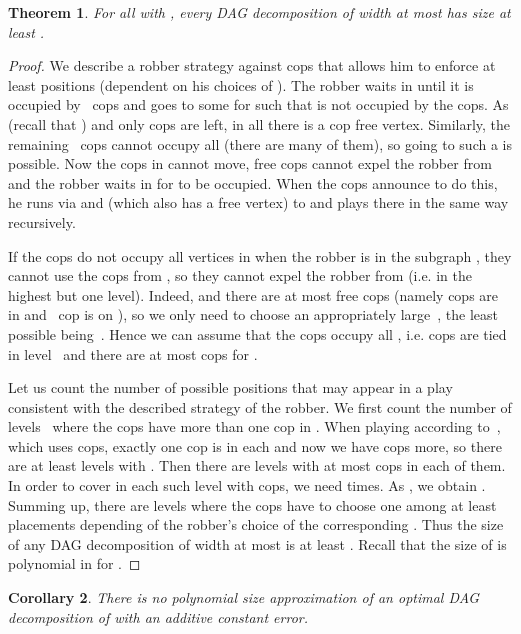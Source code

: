\documentclass[authoryear]{article}
\makeatletter
\newtheorem{theorem}{Theorem}
\newtheorem{corollary}[theorem]{Corollary}
\theoremstyle{definition}
\newcommand{\0}{\emptyset}
\newcommand{\ie}{i.e.\@\xspace}
\makeatother
\begin{document}
\begin{theorem}
  For all  with , every DAG decomposition of width at most 
  has size at least .
\end{theorem}
\begin{proof}
  We describe a robber strategy against  cops that allows
  him to enforce at least  positions (dependent on his choices of
  ). The robber waits in  until it is occupied
  by~ cops and goes to some  for  such that 
  is not occupied by the cops. As  (recall that
  ) and only  cops are left, in all
   there is a cop free vertex. Similarly, the remaining~
  cops cannot occupy all  (there are  many of them), so going to such a  is
  possible. Now the cops in  cannot move,  free cops
  cannot expel the robber from  and the robber waits in
   for  to be occupied. When the cops announce to do
  this, he runs via  and  (which also has a free
  vertex) to  and plays there in the same
  way recursively.

  If the cops do not occupy all vertices in  when the robber
  is in the subgraph , they cannot use the cops
  from , so they cannot expel the robber from 
  (\ie  in the highest but one level). Indeed, 
  and there are at most  free
  cops (namely  cops are in  and~ cop is on
  ), so we only need to choose an appropriately large~, the
  least possible being~. Hence we can assume that the
  cops occupy all , \ie  cops are tied in level~ and
  there are at most  cops for
  .

  Let us count the number of possible positions that may appear in a
  play consistent with the described strategy of the robber. We first
  count the number of levels~ where the cops have more than one
  cop in . When playing according to~, which uses
   cops, exactly one cop is in each  and now we have
   cops more, so there are at least  levels  with
  . Then there are  levels  with at
  most  cops in each of them. In order to cover
   in each such level with  cops, we need
   times. As , we
  obtain . Summing
  up, there are  levels where the cops have to choose one
  among at least  placements depending of the robber's
  choice of the corresponding . Thus the size of any DAG
  decomposition of width at most  is at least . Recall that the size of  is polynomial in
   for .


\end{proof}

\begin{corollary}
There is no polynomial size approximation of an optimal DAG
decomposition of  with an additive constant error. 
\end{corollary}
 
\end{document}
